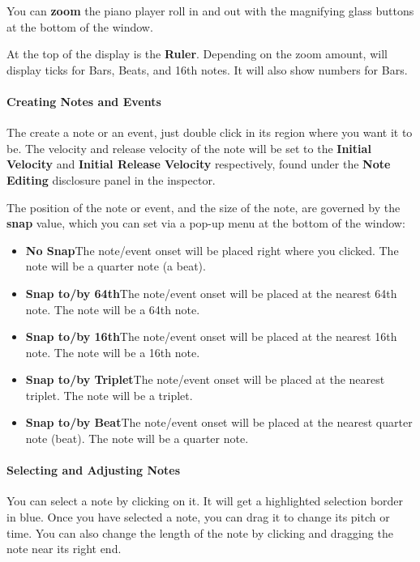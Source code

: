 \documentclass[twoside,10pt]{article}
\begin{document}
You can {\bf zoom} the piano player roll in and out with the magnifying glass buttons at the bottom of the window.

At the top of the display is the {\bf Ruler}.  Depending on the zoom amount, will display ticks for Bars, Beats, and 16th notes.  It will also show numbers for Bars.

\paragraph{Creating Notes and Events}

The create a note or an event, just double click in its region where you want it to be.  The velocity and release velocity of the note will be set to the {\bf Initial Velocity} and {\bf Initial Release Velocity} respectively, found under the {\bf Note Editing} disclosure panel in the inspector.

The position of the note or event, and the size of the note, are governed by the {\bf snap} value, which you can set via a pop-up menu at the bottom of the window:

\begin{itemize}
\item {\bf No Snap}\qquad The note/event onset will be placed right where you clicked.  The note will be a quarter note (a beat).
\item {\bf Snap to/by 64th}\qquad The note/event onset will be placed at the nearest 64th note.  The note will be a 64th note.
\item {\bf Snap to/by 16th}\qquad The note/event onset will be placed at the nearest 16th note.  The note will be a 16th note.
\item {\bf Snap to/by Triplet}\qquad The note/event onset will be placed at the nearest triplet.  The note will be a triplet.
\item {\bf Snap to/by Beat}\qquad The note/event onset will be placed at the nearest quarter note (beat).  The note will be a quarter note.
\end{itemize}

\paragraph{Selecting and Adjusting Notes}

You can select a note by clicking on it.  It will get a highlighted selection border in blue.  Once you have selected a note, you can drag it to change its pitch or time.  You can also change the length of the note by clicking and dragging the note near its right end.
\end{document}

